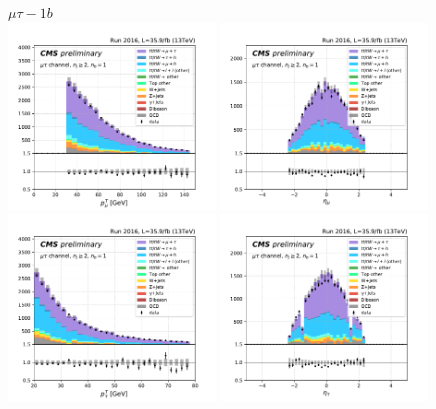 \begin{figure}[ht]
    \centering
    $\mu\tau - 1b$ \\
    \includegraphics[width=0.49\textwidth]{chapters/Analysis/sectionPlots/figures/kinematics_pickles/mutau/1b/mutau_1b_lepton1_pt.pdf}
    \includegraphics[width=0.49\textwidth]{chapters/Analysis/sectionPlots/figures/kinematics_pickles/mutau/1b/mutau_1b_lepton1_eta.pdf}
    \includegraphics[width=0.49\textwidth]{chapters/Analysis/sectionPlots/figures/kinematics_pickles/mutau/1b/mutau_1b_lepton2_pt.pdf}
    \includegraphics[width=0.49\textwidth]{chapters/Analysis/sectionPlots/figures/kinematics_pickles/mutau/1b/mutau_1b_lepton2_eta.pdf}

\end{figure}
